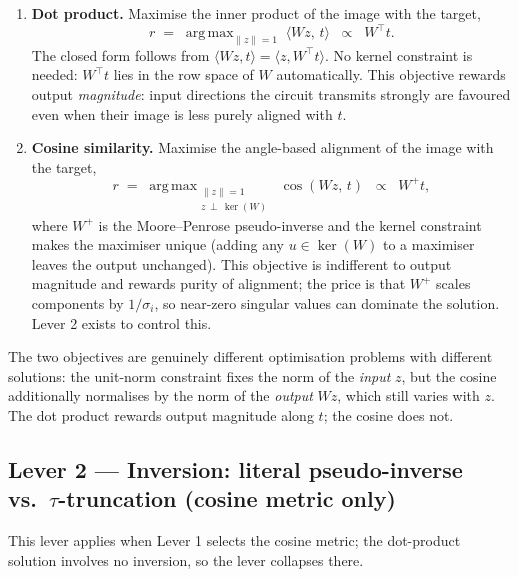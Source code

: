 \documentclass[
]{article}
\DeclareMathOperator*{\argmax}{arg\,max}
\begin{document}
\begin{enumerate}
\item
  \textbf{Dot product.} Maximise the inner product of the image with the target,
  \begin{equation}
  r \;=\; \argmax_{\|z\| = 1} \; \langle W z,\, t \rangle
  \;\;\propto\;\; W^{\top} t. \tag{1}
  \end{equation}
  The closed form follows from
  $\langle Wz, t\rangle = \langle z, W^{\top} t\rangle$. No kernel constraint is
  needed: $W^{\top} t$ lies in the row space of $W$ automatically. This objective
  rewards output \emph{magnitude}: input directions the circuit transmits strongly are
  favoured even when their image is less purely aligned with $t$.
\item
  \textbf{Cosine similarity.} Maximise the angle-based alignment of the image with the
  target,
  \begin{equation}
  r \;=\; \argmax_{\substack{\|z\| = 1 \\ z \,\perp\, \ker(W)}}
  \; \cos\!\left(W z,\, t\right)
  \;\;\propto\;\; W^{+} t, \tag{2}
  \end{equation}
  where $W^{+}$ is the Moore--Penrose pseudo-inverse and the kernel constraint makes
  the maximiser unique (adding any $u \in \ker(W)$ to a maximiser leaves the output
  unchanged). This objective is indifferent to output magnitude and rewards purity of
  alignment; the price is that $W^{+}$ scales components by $1/\sigma_i$, so
  near-zero singular values can dominate the solution. Lever 2 exists to control this.
\end{enumerate}

The two objectives are genuinely different optimisation problems with different
solutions: the unit-norm constraint fixes the norm of the \emph{input} $z$, but the
cosine additionally normalises by the norm of the \emph{output} $Wz$, which still varies
with $z$. The dot product rewards output magnitude along $t$; the cosine does not.

\subsection{Lever 2 — Inversion: literal pseudo-inverse vs.\
\texorpdfstring{$\tau$}{tau}-truncation (cosine metric only)}\label{lever-2-inversion}

This lever applies when Lever 1 selects the cosine metric; the dot-product solution
involves no inversion, so the lever collapses there.
\end{document}
